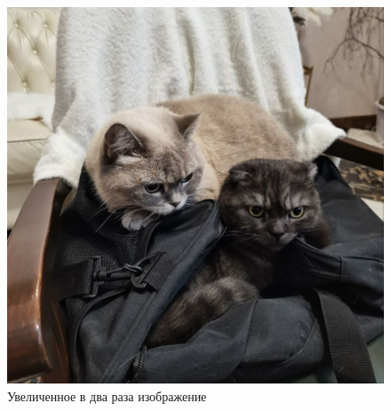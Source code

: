 \documentclass[a4paper, 16pt]{article}
\begin{document}
\begin{figure}[!htb]
    \centering
    \includegraphics[scale=0.3]{scaled_img_bigger.png}
    \captionsetup{skip=0pt}
    \caption{Увеличенное в два раза изображение}
    \label{Рис:5}
\end{figure}
\end{document}
